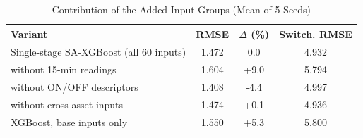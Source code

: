 \begin{table}[!t]
\caption{Contribution of the Added Input Groups (Mean of 5 Seeds)}
\label{tab:ablation}
\centering
\footnotesize
\setlength{\tabcolsep}{3pt}
\begin{tabular}{lccc}
\toprule
\textbf{Variant} & \textbf{RMSE} & \textbf{$\Delta$ (\%)} & \textbf{Switch. RMSE} \\
\midrule
Single-stage SA-XGBoost (all 60 inputs) & 1.472 & 0.0 & 4.932 \\
without 15-min readings & 1.604 & +9.0 & 5.794 \\
without ON/OFF descriptors & 1.408 & -4.4 & 4.997 \\
without cross-asset inputs & 1.474 & +0.1 & 4.936 \\
XGBoost, base inputs only & 1.550 & +5.3 & 5.800 \\
\bottomrule
\end{tabular}
\end{table}
